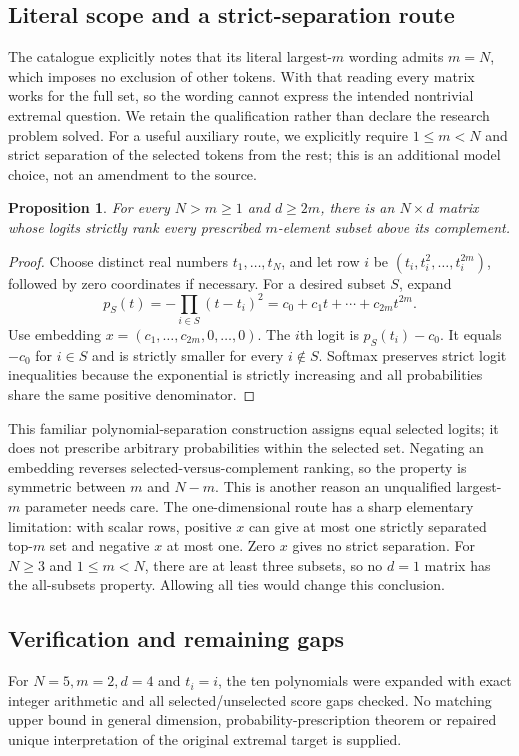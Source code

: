 \documentclass[11pt]{article}
\newtheorem{proposition}{Proposition}
\begin{document}
\subsection{Literal scope and a strict-separation route}
The catalogue explicitly notes that its literal largest-$m$ wording admits $m=N$, which imposes no exclusion of other tokens. With that reading every matrix works for the full set, so the wording cannot express the intended nontrivial extremal question. We retain the qualification rather than declare the research problem solved. For a useful auxiliary route, we explicitly require $1\le m<N$ and strict separation of the selected tokens from the rest; this is an additional model choice, not an amendment to the source.
\begin{proposition}
For every $N>m\ge1$ and $d\ge2m$, there is an $N\times d$ matrix whose logits strictly rank every prescribed $m$-element subset above its complement.
\end{proposition}
\begin{proof}
Choose distinct real numbers $t_1,\ldots,t_N$, and let row $i$ be $(t_i,t_i^2,\ldots,t_i^{2m})$, followed by zero coordinates if necessary. For a desired subset $S$, expand
\[
 p_S(t)=-\prod_{i\in S}(t-t_i)^2=c_0+c_1t+\cdots+c_{2m}t^{2m}.
\]
Use embedding $x=(c_1,\ldots,c_{2m},0,\ldots,0)$. The $i$th logit is $p_S(t_i)-c_0$. It equals $-c_0$ for $i\in S$ and is strictly smaller for every $i\notin S$. Softmax preserves strict logit inequalities because the exponential is strictly increasing and all probabilities share the same positive denominator.
\end{proof}
This familiar polynomial-separation construction assigns equal selected logits; it does not prescribe arbitrary probabilities within the selected set. Negating an embedding reverses selected-versus-complement ranking, so the property is symmetric between $m$ and $N-m$. This is another reason an unqualified largest-$m$ parameter needs care.
The one-dimensional route has a sharp elementary limitation: with scalar rows, positive $x$ can give at most one strictly separated top-$m$ set and negative $x$ at most one. Zero $x$ gives no strict separation. For $N\ge3$ and $1\le m<N$, there are at least three subsets, so no $d=1$ matrix has the all-subsets property. Allowing all ties would change this conclusion.
\subsection{Verification and remaining gaps}
For $N=5,m=2,d=4$ and $t_i=i$, the ten polynomials were expanded with exact integer arithmetic and all selected/unselected score gaps checked. No matching upper bound in general dimension, probability-prescription theorem or repaired unique interpretation of the original extremal target is supplied.
\end{document}
